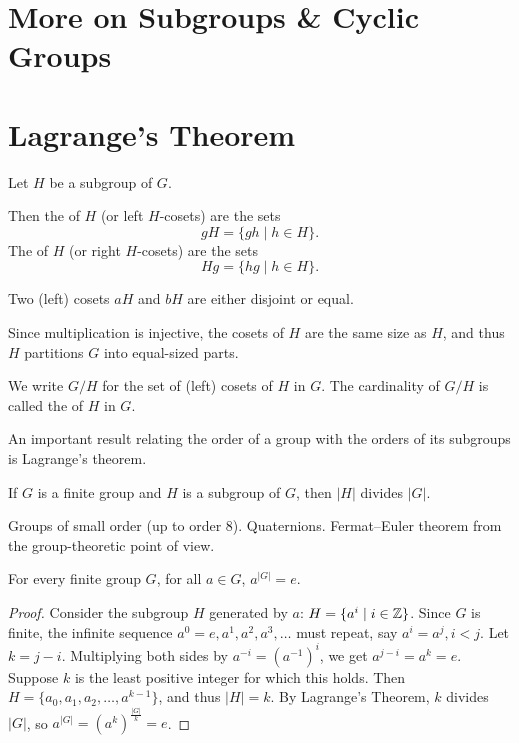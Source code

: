 \section{More on Subgroups \& Cyclic Groups}


\section{Lagrange's Theorem}
\begin{definition}[Coset]
Let $H$ be a subgroup of $G$.

Then the  of $H$ (or left $H$-cosets) are the sets
\[ gH=\{gh\mid h\in H\}. \]
The  of $H$ (or right $H$-cosets) are the sets
\[ Hg=\{hg\mid h\in H\}. \]
\end{definition}

Two (left) cosets $aH$ and $bH$ are either disjoint or equal. 

Since multiplication is injective, the cosets of $H$ are the same size as $H$, and thus $H$ partitions $G$ into equal-sized parts.

\begin{notation}
We write $G/H$ for the set of (left) cosets of $H$ in $G$. The cardinality of $G/H$ is called the  of $H$ in $G$.
\end{notation}

An important result relating the order of a group with the orders of its subgroups is Lagrange's theorem.

\begin{theorem}
If $G$ is a finite group and $H$ is a subgroup of $G$, then $|H|$ divides $|G|$.
\end{theorem}

Groups of small order (up to order 8). Quaternions. Fermat--Euler theorem
from the group-theoretic point of view.

\begin{theorem}
For every finite group $G$, for all $a \in G$, $a^{|G|}=e$.
\end{theorem}

\begin{proof}
Consider the subgroup $H$ generated by $a$: $H = \{a^i \mid i \in \mathbb Z\}$. Since $G$ is finite, the infinite sequence $a^0=e, a^1, a^2, a^3, \dots$ must repeat, say $a^i = a^j, i < j$. Let $k=j-i$. Multiplying both sides by $a^{-i} = (a^{-1})^i$, we get $a^{j-i} = a^k = e$. Suppose $k$ is the least positive integer for which this holds. Then $H = \{a_0, a_1, a_2, \dots, a^{k-1}\}$, and thus $|H| = k$. By Lagrange’s Theorem, $k$ divides $|G|$, so $a^{|G|} = (a^k)^\frac{|G|}{k} = e$.
\end{proof}

